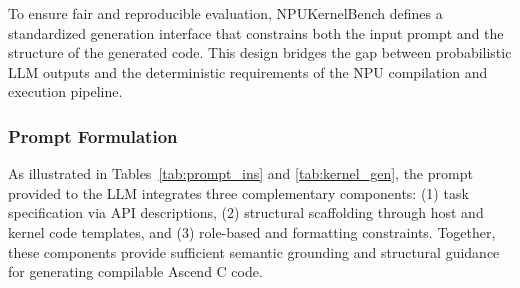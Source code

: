 To ensure fair and reproducible evaluation, NPUKernelBench defines a standardized generation interface that constrains both the input prompt and the structure of the generated code. This design bridges the gap between probabilistic LLM outputs and the deterministic requirements of the NPU compilation and execution pipeline.



\subsubsection{Prompt Formulation}
As illustrated in Tables~\ref{tab:prompt_ins} and \ref{tab:kernel_gen}, the prompt provided to the LLM integrates three complementary components: (1) task specification via API descriptions, (2) structural scaffolding through host and kernel code templates, and (3) role-based and formatting constraints. Together, these components provide sufficient semantic grounding and structural guidance for generating compilable Ascend C code.

